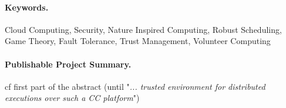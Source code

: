 \documentclass[11pt,twoside,a4paper]{article}
\begin{document}
\paragraph{Keywords.}

Cloud Computing,
Security, 
Nature Inspired Computing,
Robust Scheduling,
Game Theory,
Fault Tolerance, 
Trust Management,
Volunteer Computing


\paragraph{Publishable Project Summary.} 

cf first part of the abstract (until "\emph{...  trusted environment for distributed executions over such a CC platform}")



\end{document}
